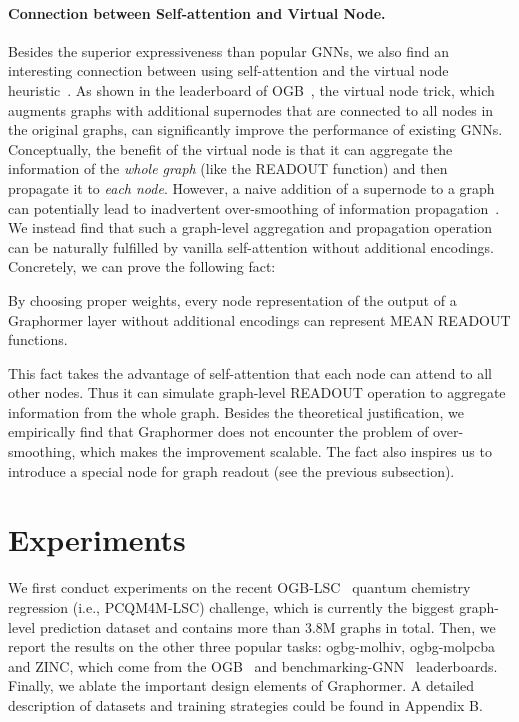 \documentclass{article}
\begin{document}
\paragraph{Connection between Self-attention and Virtual Node.} 
Besides the superior expressiveness than popular GNNs, we also find an interesting connection between using self-attention and the virtual node heuristic~\cite{gilmer2017neural,li2017learning,ishiguro2019graph,hu2020open}. As shown in the leaderboard of OGB~\cite{hu2020open}, the virtual node trick, which augments graphs with additional supernodes that are connected to all nodes in the original graphs, can significantly improve the performance of existing GNNs. Conceptually, the benefit of the virtual node is that it can aggregate the information of the \emph{whole graph} (like the READOUT function) and then propagate it to \emph{each node}. However, a naive addition of a supernode to a graph can potentially lead to inadvertent over-smoothing of information propagation~\cite{ishiguro2019graph}. We instead find that such a graph-level aggregation and propagation operation can be naturally fulfilled by vanilla self-attention without additional encodings. Concretely, we can prove the following fact:
\begin{fact}
\label{fact:readout}
By choosing proper weights, every node representation of the output of a Graphormer layer without additional encodings can represent MEAN READOUT functions.
\end{fact}
This fact takes the advantage of self-attention that each node can attend to all other nodes. Thus it can simulate graph-level READOUT operation to aggregate information from the whole graph. Besides the theoretical justification, we empirically find that Graphormer does not encounter the problem of over-smoothing, which makes the improvement scalable. The fact also inspires us to introduce a special node for graph readout (see the previous subsection).






\section{Experiments}

We first conduct experiments on the recent OGB-LSC~\cite{hu2021ogb} quantum chemistry regression (i.e., PCQM4M-LSC) challenge, which is currently the biggest graph-level prediction dataset and contains more than 3.8M graphs in total. Then, we report the results on the other three popular tasks: ogbg-molhiv, ogbg-molpcba and ZINC, which come from the OGB~\cite{hu2020open} and benchmarking-GNN~\cite{dwivedi2020benchmarking} leaderboards. Finally, we ablate the important design elements of Graphormer. A detailed description of datasets and training strategies could be found in Appendix B.
\end{document}
